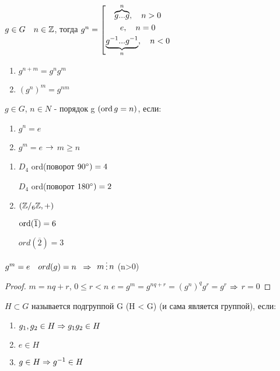 \documentclass[main]{subfiles}
\begin{document}
  \begin{definition}
      $g \in G \quad n \in \mathbb{Z}$, тогда $g^n=
  \left[
    \begin{gathered}
      \overbrace{g...g}^n, \quad n>0\\
      e, \quad n=0\\
      \underbrace{g^{-1}...g^{-1}}_n, \quad n<0
    \end{gathered}
  \right.$
  \end{definition}

  \begin{theorem}[св-ва степени]
      \begin{enumerate}
      	\item $g^{n+m}=g^n g^m$
      	\item $(g^n)^m=g^{n m}$
  	\end{enumerate}
  \end{theorem}

  \begin{definition}
      $g \in G$, $n \in N$ - порядок g $(\mathop{\rm ord}\nolimits g = n)$, если:
      \begin{enumerate}
      	\item $g^n=e$
      	\item $g^m=e$ $\rightarrow$ $m \geqslant n$
  	\end{enumerate}
  \end{definition}

  \begin{examples}
      \begin{enumerate}
      	\item $D_4$ ord(поворот $90\degree) =4$

      	$D_4$ ord(поворот $180\degree) =2$
      	\item $(\mathbb{Z} /_6 \mathbb{Z}, +)$

        $\mathop{\rm ord}\nolimits(\overline{1})=6$

      	$ord(\overline{2})=3$
  	\end{enumerate}
  \end{examples}

  \begin{utv}
      $g^m=e \quad ord(g)=n$ $\ \Rightarrow\ $ $m \devides n$ (n>0)
  \end{utv}

  \begin{proof}
      $m=n q+r$, $0 \leqslant r < n$
      $e=g^m=g^{n q + r}=(g^n)^q g^r=g^r$ $\Rightarrow$ $r=0$
  \end{proof}

  \begin{definition}
      $H \subset G$ называется подгруппой G (H < G) (и сама является группой), если:
      \begin{enumerate}
      	\item $g_1,g_2 \in H \Rightarrow g_1 g_2 \in H$
      	\item $e \in H$
      	\item $g \in H \Rightarrow g^{-1} \in H$
  	\end{enumerate}
  \end{definition}
\end{document}
